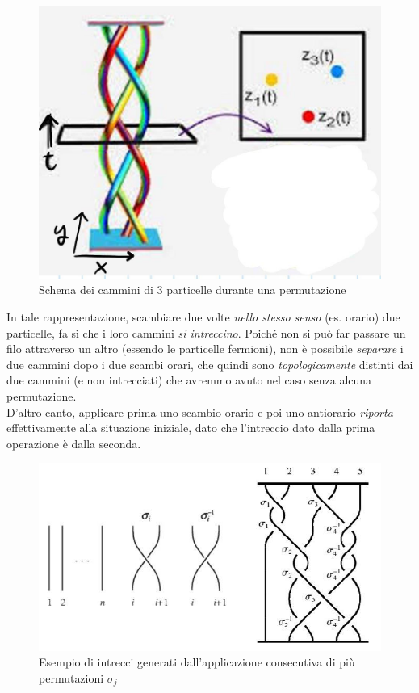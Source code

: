 \documentclass[../../FisicaTeorica.tex]{subfiles}
\begin{document}
\begin{figure}[H]
\centering
\includegraphics[scale=0.3]{Immagini/12_12/image007.jpg}
\caption{Schema dei cammini di $3$ particelle durante una permutazione\label{fig:braids}}
\end{figure}

In tale rappresentazione, scambiare due volte \textit{nello stesso senso} (es. orario) due particelle, fa sì che i loro cammini \textit{si intreccino}. Poiché non si può far passare un filo attraverso un altro (essendo le particelle fermioni), non è possibile \textit{separare} i due cammini dopo i due scambi orari, che quindi sono \textit{topologicamente} distinti dai due cammini  (e non intrecciati) che avremmo avuto nel caso senza alcuna permutazione.\\
D'altro canto, applicare prima uno scambio orario e poi uno antiorario \textit{riporta} effettivamente alla situazione iniziale, dato che l'intreccio dato dalla prima operazione è  dalla seconda.

\begin{figure}[H]
\centering
\includegraphics[scale=0.5]{Immagini/12_12/image008.jpg}
\caption{Esempio di intrecci generati dall'applicazione consecutiva di più permutazioni $\sigma_j$}
\end{figure}
\end{document}
